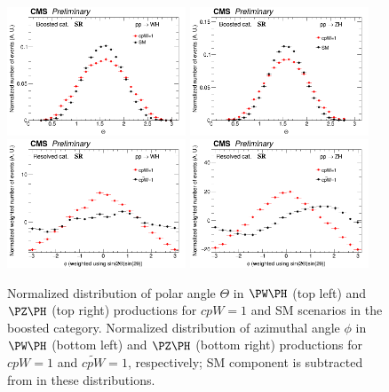 \documentclass[a4paper,11pt]{article}
\begin{document}
\begin{figure}[hbtp]
\begin{center}
\includegraphics[width=0.475\textwidth]{Figures/RECO/Angle/WH/Boosted_Plot_Theta.png}
\includegraphics[width=0.475\textwidth]{Figures/RECO/Angle/ZH/Boosted_Plot_Theta.png}
\includegraphics[width=0.475\textwidth]{Figures/RECO/CP/WH/Resolved_Plot_phi.png}
\includegraphics[width=0.475\textwidth]{Figures/RECO/CP/ZH/Resolved_Plot_phi.png}
\end{center}
\caption{
Normalized distribution of polar angle $\Theta$ in $\PW\PH$ (top left) and $\PZ\PH$ (top right) productions for $cpW=1$ and SM scenarios in the boosted category. 
Normalized distribution of azimuthal angle $\phi$ in  $\PW\PH$ (bottom left) and $\PZ\PH$ (bottom right) productions for $cpW=1$ and $\tilde{cpW}=1$, respectively; SM component is subtracted from in these distributions.
}
\label{fig:angles}
\end{figure}
\end{document}
